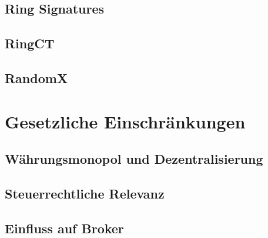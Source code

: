 \section{Ring Signatures}

\section{RingCT}

\section{RandomX}

\chapter{Gesetzliche Einschränkungen}

\section{Währungsmonopol und Dezentralisierung}

\section{Steuerrechtliche Relevanz}

\section{Einfluss auf Broker}